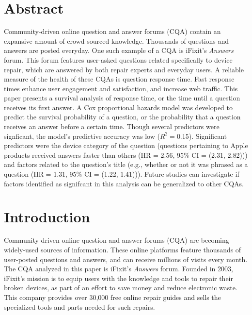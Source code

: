 \documentclass{article}
\begin{document}




\section*{Abstract}

Community-driven online question and answer forums (CQA) contain an expansive amount of crowd-sourced knowledge. Thousands of questions and answers are posted everyday. One such example of a CQA is iFixit's \textit{Answers} forum. This forum features user-asked questions related specifically to device repair, which are answered by both repair experts and everyday users. A reliable measure of the health of these CQAs is question response time. Fast response times enhance user engagement and satisfaction, and increase web traffic. This paper presents a survival analysis of response time, or the time until a question receives its first answer. A Cox proportional hazards model was developed to predict the survival probability of a question, or the probability that a question receives an answer before a certain time. Though several predictors were signficant, the model's predictive accuracy was low ($R^2 = 0.15$). Significant predictors were the device category of the question (questions pertaining to Apple products received answers faster than others (HR = 2.56, 95\% CI = (2.31, 2.82))) and factors related to the question's title (e.g., whether or not it was phrased as a question (HR = 1.31, 95\% CI = (1.22, 1.41))). Future studies can investigate if factors identified as signifcant in this analysis can be generalized to other CQAs. 


\section*{Introduction}

Community-driven online question and answer forums (CQA) are becoming widely-used sources of information. These online platforms feature thousands of user-posted questions and answers, and can receive millions of visits every month. The CQA analyzed in this paper is iFixit's \textit{Answers} forum. Founded in 2003, iFixit's mission is to equip users with the knowledge and tools to repair their broken devices, as part of an effort to save money and reduce electronic waste. This company provides over 30,000 free online repair guides and sells the specialized tools and parts needed for such repairs.
    
\end{document}
